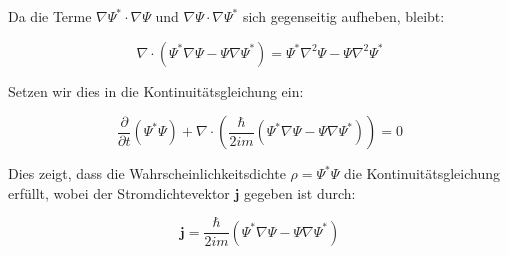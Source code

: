Da die Terme \(\nabla \Psi^* \cdot \nabla \Psi\) und \(\nabla \Psi \cdot \nabla \Psi^*\) sich gegenseitig aufheben, bleibt:

\[
\nabla \cdot (\Psi^* \nabla \Psi - \Psi \nabla \Psi^*) = \Psi^* \nabla^2 \Psi - \Psi \nabla^2 \Psi^*
\]

Setzen wir dies in die Kontinuitätsgleichung ein:

\[
\frac{\partial}{\partial t} (\Psi^* \Psi) + \nabla \cdot \left(\frac{\hbar}{2 i m} \left(\Psi^* \nabla \Psi - \Psi \nabla \Psi^*\right)\right) = 0
\]

Dies zeigt, dass die Wahrscheinlichkeitsdichte \(\rho = \Psi^* \Psi\) die Kontinuitätsgleichung erfüllt, wobei der Stromdichtevektor \(\mathbf{j}\) gegeben ist durch:

\[
\mathbf{j} = \frac{\hbar}{2 i m} \left(\Psi^* \nabla \Psi - \Psi \nabla \Psi^*\right)
\]